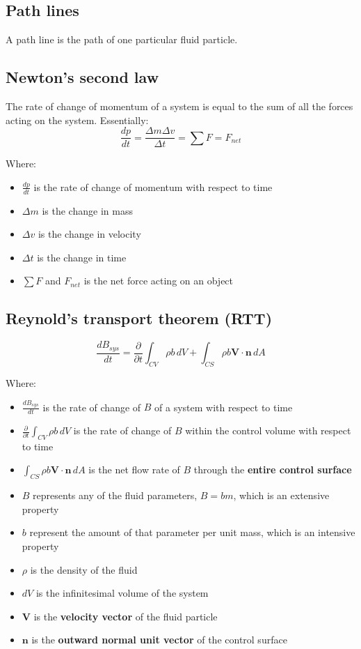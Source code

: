\documentclass[11pt]{article}
\begin{document}
\subsection{Path lines}
\label{sec:orgc3c15d1}
A path line is the path of one particular fluid particle.

\subsection{Newton's second law}
\label{sec:org77a534e}
The rate of change of momentum of a system is equal to the sum of all the forces acting on the system. Essentially:
\[\frac{dp}{dt} = \frac{\Delta m \Delta v}{\Delta t} = \sum F = F_{net}\]

Where:
\begin{itemize}
\item \(\frac{dp}{dt}\) is the rate of change of momentum with respect to time
\item \(\Delta m\) is the change in mass
\item \(\Delta v\) is the change in velocity
\item \(\Delta t\) is the change in time
\item \(\sum F\) and \(F_{net}\) is the net force acting on an object
\end{itemize}

\subsection{Reynold's transport theorem (RTT)}
\label{sec:org8304310}
\[\frac{dB_{sys}}{dt} = \frac{\partial}{\partial t} \int_{CV} \rho b \, dV + \int_{CS} \rho b \boldsymbol{V} \cdot \boldsymbol{n} \, dA\]

Where:
\begin{itemize}
\item \(\frac{dB_{sys}}{dt}\) is the rate of change of \(B\) of a system with respect to time
\item \(\frac{\partial}{\partial t} \int_{CV} \rho b \, dV\) is the rate of change of \(B\) within the control volume with respect to time
\item \(\int_{CS} \rho b \boldsymbol{V} \cdot \boldsymbol{n} \, dA\) is the net flow rate of \(B\) through the \textbf{entire control surface}
\item \(B\) represents any of the fluid parameters, \(B = bm\), which is an extensive property
\item \(b\) represent the amount of that parameter per unit mass, which is an intensive property
\item \(\rho\) is the density of the fluid
\item \(dV\) is the infinitesimal volume of the system
\item \(\boldsymbol{V}\) is the \textbf{velocity vector} of the fluid particle
\item \(\boldsymbol{n}\) is the \textbf{outward normal unit vector} of the control surface
\end{itemize}
\end{document}
